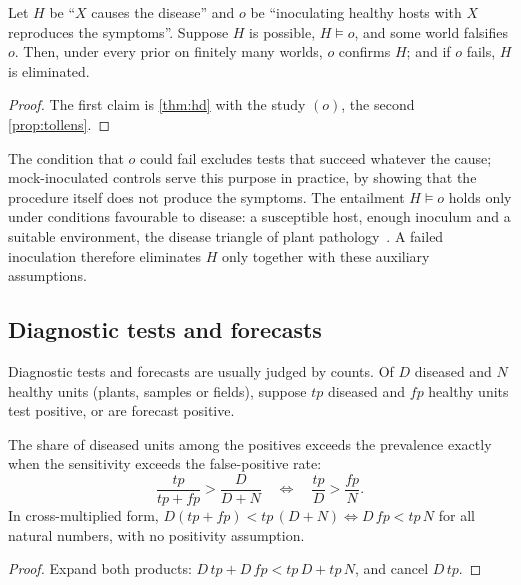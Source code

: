 \begin{proposition}\label{prop:koch}
Let $H$ be ``$X$ causes the disease'' and $o$ be ``inoculating healthy hosts with $X$ reproduces
the symptoms''. Suppose $H$ is possible, $H\models o$, and some world falsifies $o$. Then, under
every prior on finitely many worlds, $o$ confirms $H$; and if $o$ fails, $H$ is eliminated.
\end{proposition}

\begin{proof}
The first claim is \cref{thm:hd} with the study $(o)$, the second \cref{prop:tollens}.
\end{proof}

The condition that $o$ could fail excludes tests that succeed whatever the cause; mock-inoculated
controls serve this purpose in practice, by showing that the procedure itself does not produce the
symptoms. The entailment $H\models o$ holds only under conditions favourable to disease: a
susceptible host, enough inoculum and a suitable environment, the disease triangle of plant
pathology~\cite{agrios2005}. A failed inoculation therefore eliminates $H$ only together with
these auxiliary assumptions.

\subsection{Diagnostic tests and forecasts}

Diagnostic tests and forecasts are usually judged by counts. Of $D$ diseased and $N$ healthy
units (plants, samples or fields), suppose $tp$ diseased and $fp$ healthy units test positive, or
are forecast positive.

\begin{proposition}\label{prop:plantconfirm}
The share of diseased units among the positives exceeds the prevalence exactly when the
sensitivity exceeds the false-positive rate:
\[
  \frac{tp}{tp+fp}>\frac{D}{D+N}\quad\iff\quad\frac{tp}{D}>\frac{fp}{N}.
\]
In cross-multiplied form, $D(tp+fp)<tp\,(D+N)\iff D\,fp<tp\,N$ for all natural numbers, with no
positivity assumption.
\end{proposition}

\begin{proof}
Expand both products: $D\,tp+D\,fp<tp\,D+tp\,N$, and cancel $D\,tp$.
\end{proof}

